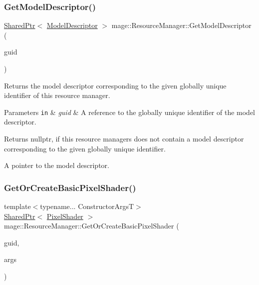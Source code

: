 \subsubsection{\texorpdfstring{Get\+Model\+Descriptor()}{GetModelDescriptor()}}
{\footnotesize\ttfamily \hyperlink{namespacemage_a1e01ae66713838a7a67d30e44c67703e}{Shared\+Ptr}$<$ \hyperlink{classmage_1_1_model_descriptor}{Model\+Descriptor} $>$ mage\+::\+Resource\+Manager\+::\+Get\+Model\+Descriptor (\begin{DoxyParamCaption}\item[{const wstring \&}]{guid }\end{DoxyParamCaption})\hspace{0.3cm}{\ttfamily [noexcept]}}

Returns the model descriptor corresponding to the given globally unique identifier of this resource manager.


\begin{DoxyParams}[1]{Parameters}
\mbox{\tt in}  & {\em guid} & A reference to the globally unique identifier of the model descriptor. \\
\hline
\end{DoxyParams}
\begin{DoxyReturn}{Returns}
{\ttfamily nullptr}, if this resource managers does not contain a model descriptor corresponding to the given globally unique identifier. 

A pointer to the model descriptor. 
\end{DoxyReturn}
\hypertarget{classmage_1_1_resource_manager_a05e5f5b7554ee225e576952206a9bb1e}{}\label{classmage_1_1_resource_manager_a05e5f5b7554ee225e576952206a9bb1e} 
\subsubsection{\texorpdfstring{Get\+Or\+Create\+Basic\+Pixel\+Shader()}{GetOrCreateBasicPixelShader()}}
{\footnotesize\ttfamily template$<$typename... Constructor\+ArgsT$>$ \\
\hyperlink{namespacemage_a1e01ae66713838a7a67d30e44c67703e}{Shared\+Ptr}$<$ \hyperlink{classmage_1_1_pixel_shader}{Pixel\+Shader} $>$ mage\+::\+Resource\+Manager\+::\+Get\+Or\+Create\+Basic\+Pixel\+Shader (\begin{DoxyParamCaption}\item[{const wstring \&}]{guid,  }\item[{Constructor\+ArgsT \&\&...}]{args }\end{DoxyParamCaption})}

